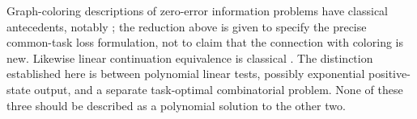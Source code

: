 Graph-coloring descriptions of zero-error information problems have
classical antecedents, notably \cite{Witsenhausen1976}; the reduction above
is given to specify the precise common-task loss formulation, not to
claim that the connection with coloring is new. Likewise linear
continuation equivalence is classical \cite{Tzeng1992,Kiefer2020}.
The distinction established here is between polynomial linear tests,
possibly exponential positive-state output, and a separate task-optimal
combinatorial problem. None of these three should be described as a
polynomial solution to the other two.
